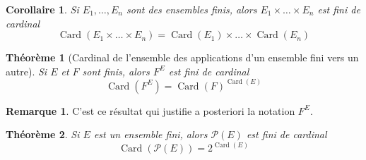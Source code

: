 \documentclass[french]{book}
\theoremstyle{plain}
\newtheorem{thm}{Théorème}[chapter]
\newtheorem{cor}{Corollaire}[chapter]
\theoremstyle{definition}
\newtheorem{rmq}{Remarque}[chapter]
\theoremstyle{remark}
\DeclareMathOperator{\card}{Card}
\begin{document}
\begin{cor}
	Si $E_1,\ldots,E_n$ sont des ensembles finis, alors $E_1\times\ldots\times E_n$ est fini de cardinal $$\card(E_1\times\ldots\times E_n)=\card(E_1)\times\ldots\times\card(E_n)$$
\end{cor}
\begin{thm}[Cardinal de l'ensemble des applications d'un ensemble fini vers un autre]
	Si $E$ et $F$ sont finis, alors $F^E$ est fini de cardinal $$\card\left(F^E\right)=\card(F)^{\card(E)}$$
\end{thm}
\begin{rmq} C'est ce résultat qui justifie a posteriori la notation $F^E$. \end{rmq}
\begin{thm}
	Si $E$ est un ensemble fini, alors $\mathcal{P}(E)$ est fini de cardinal $$\card\left(\mathcal{P}(E)\right)=2^{\card(E)}$$
\end{thm}
\end{document}
